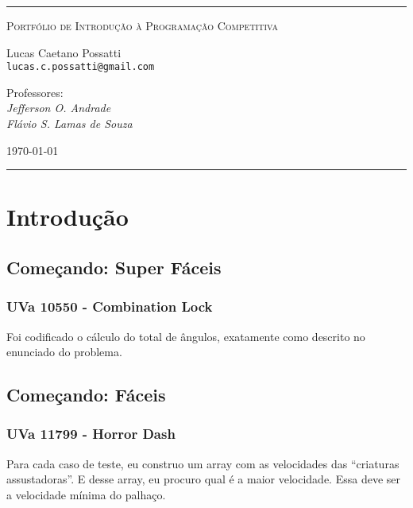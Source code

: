 \documentclass[11pt]{scrartcl}
\begin{document}
\vspace*{\fill}

\hrule
\begin{center}
\Huge
\textsc{Portfólio de Introdução à Programação Competitiva}

\medskip
\Large
Lucas Caetano Possatti\\
\large
\texttt{lucas.c.possatti@gmail.com}

\bigskip

Professores:\\
\emph{Jefferson O. Andrade}\\
\emph{Flávio S. Lamas de Souza}

\bigskip

\today
\end{center}
\hrule

\vspace*{\fill}
\thispagestyle{empty}

\newpage

\setcounter{tocdepth}{2}
\tableofcontents

\newpage


\section{Introdução}

\subsection{Começando: Super Fáceis}
\subsubsection{UVa 10550 - Combination Lock}
Foi codificado o cálculo do total de ângulos, exatamente como descrito
no enunciado do problema.


\subsection{Começando: Fáceis}
\subsubsection{UVa 11799 - Horror Dash}
Para cada caso de teste, eu construo um array com as velocidades das ``criaturas assustadoras''. E desse array, eu procuro qual é a maior velocidade. Essa deve ser a velocidade mínima do palhaço.

\end{document}
